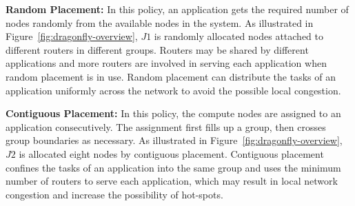 \textbf{Random Placement:} In this policy, an application gets the required number of nodes randomly from the available nodes in the system. As illustrated in Figure~\ref{fig:dragonfly-overview}, $J1$ is randomly allocated nodes attached to different routers in different groups. Routers may be shared by different applications and more routers are involved in serving each application when random placement is in use. Random placement can distribute the tasks of an application uniformly across the network to avoid the possible local congestion. 



\textbf{Contiguous Placement:} In this policy, the compute nodes are assigned to an application consecutively. The assignment first fills up a group, then crosses group boundaries as necessary. As illustrated in Figure~\ref{fig:dragonfly-overview}, $J2$ is allocated eight nodes by contiguous placement. Contiguous placement confines the tasks of an application into the same group and uses the minimum number of routers to serve each application, which may result in local network congestion and increase the possibility of hot-spots. 
